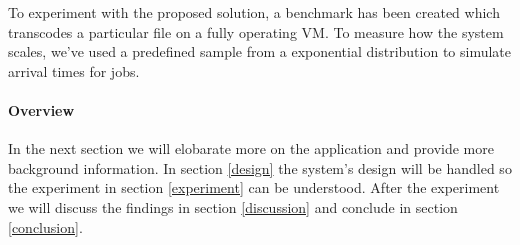 To experiment with the proposed solution, a benchmark has been
created which transcodes a particular file on a fully operating VM. To
measure how the system scales, we've used a predefined sample from a
exponential distribution to simulate arrival times for jobs.

\paragraph{Overview}
In the next section we will elobarate more on the application and
provide more background information. In section \ref{design} the
system's design will be handled so the experiment in section
\ref{experiment} can be understood. After the experiment we will
discuss the findings in section \ref{discussion} and conclude in
section \ref{conclusion}.

